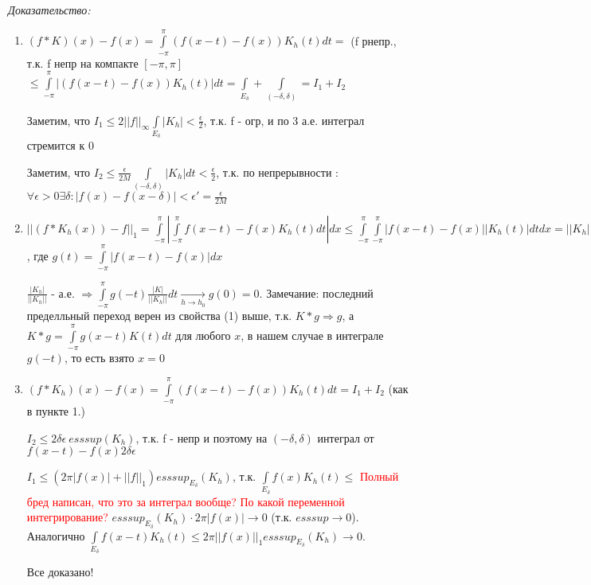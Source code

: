 \documentclass[paper=a4, fontsize=14pt]{report}
\begin{document}
    
    \emph{Доказательство:}
	\begin{enumerate}
		\item $(f*K)(x) - f(x) =  \int\limits_{-\pi}^{\pi} (f(x-t)-f(x))K_h(t)dt = $ (f рнепр., т.к. f непр на компакте $[-\pi, \pi]$  $\leq \int\limits_{-\pi}^{\pi} |(f(x-t)-f(x))K_h(t)|dt = \int\limits_{E_{\delta}} + \int\limits_{(-\delta, \delta)} = I_1 + I_2$

		Заметим, что $I_1 \leq 2 ||f||_{\infty}\int\limits_{E_{\delta}}|K_h| < \frac{\epsilon}{2}$, т.к. f - огр, и по 3  а.е. интеграл стремится к 0

		Заметим, что $I_2 \leq \frac{\epsilon}{2 M} \int\limits_{(-\delta, \delta)}|K_h|dt < \frac{\epsilon}{2}$, т.к. по непрерывности : $\forall \epsilon > 0 \exists \delta : |f(x) - f(x - \delta)| < \epsilon' = \frac{\epsilon}{2 M}$

		\item $||(f * K_h(x)) - f||_1 = \int\limits_{-\pi}^{\pi} |\int\limits_{-\pi}^{\pi} f(x-t)-f(x)K_h(t)dt|dx \leq \int\limits_{-\pi}^{\pi}\int\limits_{-\pi}^{\pi}|f(x-t)-f(x)||K_h(t)|dtdx = ||K_h||_1 \int\limits_{-\pi}^{\pi}g(-t)\frac{K(t)}{||K_h||_1}dt$, где $g(t) = \int\limits_{-\pi}^{\pi}|f(x-t)-f(x)|dx$

		$\frac{|K_h|}{||K_h||}$ - а.е. $\Rightarrow \int\limits_{-\pi}^{\pi}g(-t)\frac{|K|}{||K_h||}dt \underset{h \rightarrow h_0}{\rightarrow} g(0) = 0 $. Замечание: последний пределльный переход верен из свойства (1) выше, т.к. $K*g \Rightarrow g$, а $K*g = \int\limits_{-\pi}^{\pi}g(x-t)K(t)dt$ для любого $x$, в нашем случае в интеграле $g(-t)$, то есть взято $x = 0$

		\item $(f*K_h)(x) - f(x) = \int\limits_{-\pi}^{\pi} (f(x-t)-f(x))K_h(t)dt = I_1 + I_2$ (как в пункте 1.)

		$I_2 \leq 2 \delta \epsilon ~ esssup(K_h) $, т.к. f - непр и поэтому на $(-\delta, \delta)$ интеграл от $f(x-t)-f(x) 2 \delta \epsilon$

		$I_1 \leq (2 \pi |f(x)| + ||f||_1 ) esssup_{E_{\delta}}(K_h) $, т.к. $\int\limits_{E_{\delta}} f(x)K_h(t) \leq$ \textcolor{red}{Полный бред написан, что это за интеграл вообще? По какой переменной интегрирование?} $esssup_{E_{\delta}}(K_h) \cdot 2 \pi |f(x)| \rightarrow 0$ (т.к. $esssup \rightarrow 0$). Аналогично $\int\limits_{E_{\delta}} f(x-t)K_h(t) \leq 2 \pi ||f(x)||_1 esssup_{E_{\delta}}(K_h) \rightarrow 0$.

		Все доказано!

\end{enumerate}
\end{document}
